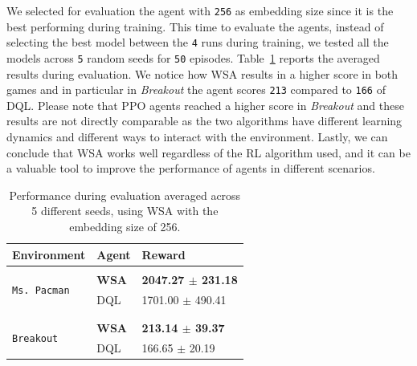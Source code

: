 We selected for evaluation the agent with \texttt{256} as embedding size since it is the best performing during training.
This time to evaluate the agents, instead of selecting the best model between the \texttt{4} runs during training, we tested all the models across \texttt{5} random seeds for \texttt{50} episodes.
Table~\ref{tab:dqn_results} reports the averaged results during evaluation.
We notice how WSA results in a higher score in both games and in particular in \textit{Breakout} the agent scores \texttt{213} compared to \texttt{166} of DQL\@.
Please note that PPO agents reached a higher score in \textit{Breakout} and these results are not directly comparable as the two algorithms have different learning dynamics and different ways to interact with the environment.
Lastly, we can conclude that WSA works well regardless of the RL algorithm used, and it can be a valuable tool to improve the performance of agents in different scenarios.



\begin{table}[ht]
    \begin{center}
        \begin{tabular}{lll}
            \multicolumn{1}{l}{Environment}  &\multicolumn{1}{l}{\textbf{Agent}} &\multicolumn{1}{l}{\textbf{Reward}}
            \\ \hline \\

            \multirow{2}{*}{\texttt{Ms. Pacman}}
                                  & \textbf{WSA} & \textbf{2047.27 $\pm$ 231.18} \\
                                  & DQL & 1701.00 $\pm$ 490.41 \\
                                  \\ \hline \\

            \multirow{2}{*}{\texttt{Breakout}}
                                  & \textbf{WSA} & \textbf{213.14 $\pm$ 39.37} \\
                                  & DQL & 166.65 $\pm$ 20.19 \\

        \end{tabular}
    \end{center}
    \caption{Performance during evaluation averaged across 5 different seeds, using WSA with the embedding size of 256.}
    \label{tab:dqn_results}
\end{table}



